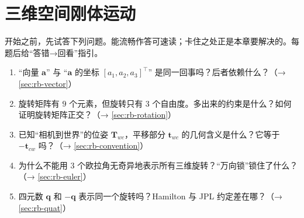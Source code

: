 \chapter{三维空间刚体运动}
\label{ch:rigid_body}


\begin{practice}[前置自测]
开始之前，先试答下列问题。能流畅作答可速读；卡住之处正是本章要解决的。每题后给“答错→回看”指引。
\begin{enumerate}
  \item “向量 $\mathbf{a}$” 与 “$\mathbf{a}$ 的坐标 $[a_1,a_2,a_3]^\top$” 是同一回事吗？后者依赖什么？（→ \cref{sec:rb-vector}）
  \item 旋转矩阵有 $9$ 个元素，但旋转只有 $3$ 个自由度。多出来的约束是什么？如何证明旋转矩阵正交？（→ \cref{sec:rb-rotation}）
  \item 已知“相机到世界”的位姿 $\mathbf{T}_{wc}$，平移部分 $\mathbf{t}_{wc}$ 的几何含义是什么？它等于 $-\mathbf{t}_{cw}$ 吗？（→ \cref{sec:rb-convention}）
  \item 为什么不能用 $3$ 个欧拉角无奇异地表示所有三维旋转？“万向锁”锁住了什么？（→ \cref{sec:rb-euler}）
  \item 四元数 $\mathbf{q}$ 和 $-\mathbf{q}$ 表示同一个旋转吗？Hamilton 与 JPL 约定差在哪？（→ \cref{sec:rb-quat}）
\end{enumerate}
\end{practice}

